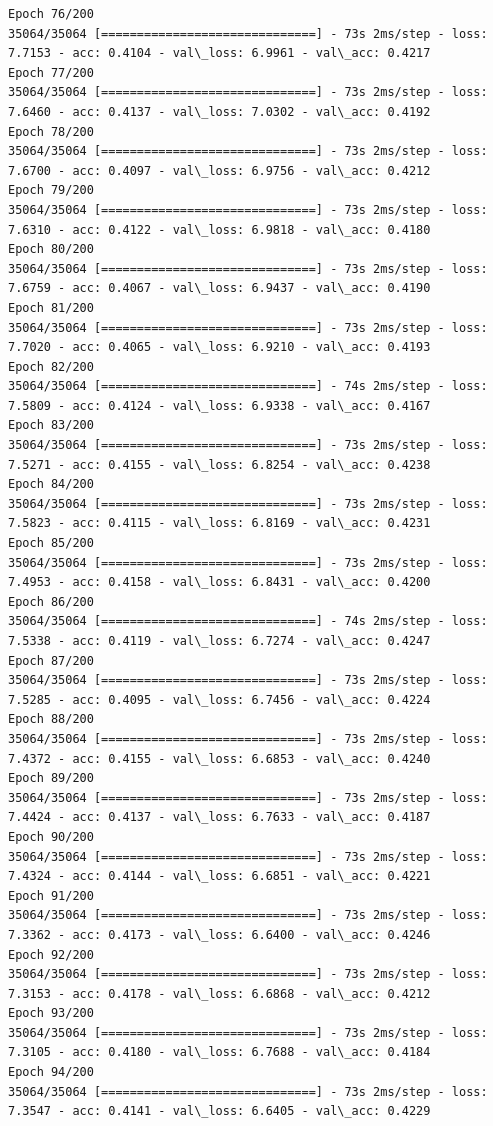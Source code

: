 \documentclass[11pt]{article}
\begin{document}
\begin{Verbatim}[commandchars=\\\{\}]
Epoch 76/200
35064/35064 [==============================] - 73s 2ms/step - loss: 7.7153 - acc: 0.4104 - val\_loss: 6.9961 - val\_acc: 0.4217
Epoch 77/200
35064/35064 [==============================] - 73s 2ms/step - loss: 7.6460 - acc: 0.4137 - val\_loss: 7.0302 - val\_acc: 0.4192
Epoch 78/200
35064/35064 [==============================] - 73s 2ms/step - loss: 7.6700 - acc: 0.4097 - val\_loss: 6.9756 - val\_acc: 0.4212
Epoch 79/200
35064/35064 [==============================] - 73s 2ms/step - loss: 7.6310 - acc: 0.4122 - val\_loss: 6.9818 - val\_acc: 0.4180
Epoch 80/200
35064/35064 [==============================] - 73s 2ms/step - loss: 7.6759 - acc: 0.4067 - val\_loss: 6.9437 - val\_acc: 0.4190
Epoch 81/200
35064/35064 [==============================] - 73s 2ms/step - loss: 7.7020 - acc: 0.4065 - val\_loss: 6.9210 - val\_acc: 0.4193
Epoch 82/200
35064/35064 [==============================] - 74s 2ms/step - loss: 7.5809 - acc: 0.4124 - val\_loss: 6.9338 - val\_acc: 0.4167
Epoch 83/200
35064/35064 [==============================] - 73s 2ms/step - loss: 7.5271 - acc: 0.4155 - val\_loss: 6.8254 - val\_acc: 0.4238
Epoch 84/200
35064/35064 [==============================] - 73s 2ms/step - loss: 7.5823 - acc: 0.4115 - val\_loss: 6.8169 - val\_acc: 0.4231
Epoch 85/200
35064/35064 [==============================] - 73s 2ms/step - loss: 7.4953 - acc: 0.4158 - val\_loss: 6.8431 - val\_acc: 0.4200
Epoch 86/200
35064/35064 [==============================] - 74s 2ms/step - loss: 7.5338 - acc: 0.4119 - val\_loss: 6.7274 - val\_acc: 0.4247
Epoch 87/200
35064/35064 [==============================] - 73s 2ms/step - loss: 7.5285 - acc: 0.4095 - val\_loss: 6.7456 - val\_acc: 0.4224
Epoch 88/200
35064/35064 [==============================] - 73s 2ms/step - loss: 7.4372 - acc: 0.4155 - val\_loss: 6.6853 - val\_acc: 0.4240
Epoch 89/200
35064/35064 [==============================] - 73s 2ms/step - loss: 7.4424 - acc: 0.4137 - val\_loss: 6.7633 - val\_acc: 0.4187
Epoch 90/200
35064/35064 [==============================] - 73s 2ms/step - loss: 7.4324 - acc: 0.4144 - val\_loss: 6.6851 - val\_acc: 0.4221
Epoch 91/200
35064/35064 [==============================] - 73s 2ms/step - loss: 7.3362 - acc: 0.4173 - val\_loss: 6.6400 - val\_acc: 0.4246
Epoch 92/200
35064/35064 [==============================] - 73s 2ms/step - loss: 7.3153 - acc: 0.4178 - val\_loss: 6.6868 - val\_acc: 0.4212
Epoch 93/200
35064/35064 [==============================] - 73s 2ms/step - loss: 7.3105 - acc: 0.4180 - val\_loss: 6.7688 - val\_acc: 0.4184
Epoch 94/200
35064/35064 [==============================] - 73s 2ms/step - loss: 7.3547 - acc: 0.4141 - val\_loss: 6.6405 - val\_acc: 0.4229

\end{Verbatim}
\end{document}
